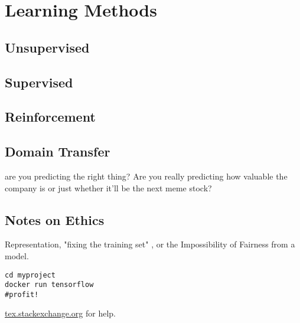 \setchapterpreamble[u]{\margintoc}
\chapter{Learning Methods}

\section{Unsupervised}
\section{Supervised}
\section{Reinforcement}
\section{Domain Transfer}

are you predicting the right thing? Are you really predicting how valuable the company is or just whether it'll be the next meme stock?

\section{Notes on Ethics}

Representation, "fixing the training set" , or the Impossibility of Fairness from a model.



\begin{lstlisting}[style=kaolstplain,linewidth=1.5\textwidth]
cd myproject
docker run tensorflow
#profit!
\end{lstlisting}

\url{tex.stackexchange.org} for help.
